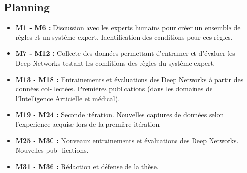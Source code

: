 \documentclass[french]{article}
\begin{document}
\subsection{Planning}
\label{sec:org2dc06f3}
\begin{itemize}
\item \textbf{M1 - M6 :} Discussion avec les experts humains pour créer un ensemble de règles et un système expert. Identification des conditions pour ces règles.
\item \textbf{M7 - M12 :} Collecte des données permettant d’entrainer et d’évaluer les Deep Networks testant les conditions des règles du système expert.
\item \textbf{M13 - M18 :} Entrainements et évaluations des Deep Networks à partir des données col- lectées. Premières publications (dans les domaines de l’Intelligence Articielle et médical).
\item \textbf{M19 - M24 :} Seconde itération. Nouvelles captures de données selon l’experience acquise lors de la première itération.
\item \textbf{M25 - M30 :} Nouveaux entrainements et évaluations des Deep Networks. Nouvelles pub- lications.
\item \textbf{M31 - M36 :} Rédaction et défense de la thèse.
\end{itemize}




\end{document}
